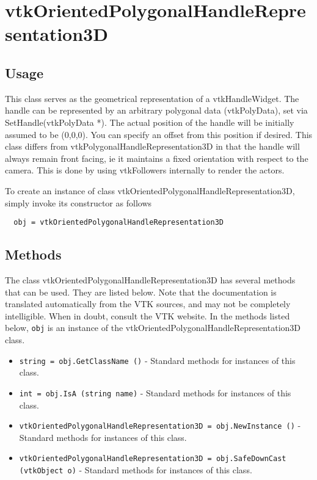 \section{vtkOrientedPolygonalHandleRepresentation3D}

\subsection{Usage}

 This class serves as the geometrical representation of a vtkHandleWidget. 
 The handle can be represented by an arbitrary polygonal data (vtkPolyData),
 set via SetHandle(vtkPolyData *). The actual position of the handle 
 will be initially assumed to be (0,0,0). You can specify an offset from
 this position if desired. This class differs from 
 vtkPolygonalHandleRepresentation3D in that the handle will always remain
 front facing, ie it maintains a fixed orientation with respect to the 
 camera. This is done by using vtkFollowers internally to render the actors.

To create an instance of class vtkOrientedPolygonalHandleRepresentation3D, simply
invoke its constructor as follows
\begin{verbatim}
  obj = vtkOrientedPolygonalHandleRepresentation3D
\end{verbatim}
\subsection{Methods}

The class vtkOrientedPolygonalHandleRepresentation3D has several methods that can be used.
  They are listed below.
Note that the documentation is translated automatically from the VTK sources,
and may not be completely intelligible.  When in doubt, consult the VTK website.
In the methods listed below, \verb|obj| is an instance of the vtkOrientedPolygonalHandleRepresentation3D class.
\begin{itemize}
\item  \verb|string = obj.GetClassName ()| -  Standard methods for instances of this class.

\item  \verb|int = obj.IsA (string name)| -  Standard methods for instances of this class.

\item  \verb|vtkOrientedPolygonalHandleRepresentation3D = obj.NewInstance ()| -  Standard methods for instances of this class.

\item  \verb|vtkOrientedPolygonalHandleRepresentation3D = obj.SafeDownCast (vtkObject o)| -  Standard methods for instances of this class.

\end{itemize}
